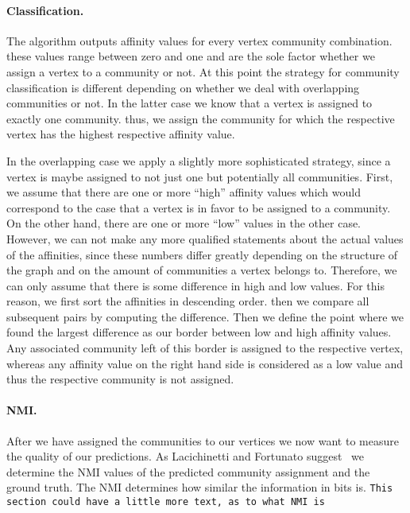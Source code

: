 \paragraph{Classification.}
The algorithm outputs affinity values for every vertex community combination. 
these values range between zero and one and are the sole factor whether we 
assign a vertex to a community or not. At this point the strategy for community classification is 
different depending on whether we deal with overlapping communities or not. In the latter case we 
know that a vertex is assigned to exactly one community. thus, we assign the community for which 
the respective vertex has the highest respective affinity value. 

In the overlapping case we apply a slightly more sophisticated strategy, since a vertex is maybe 
assigned to not just one but potentially all communities. First, we assume that there are one 
or more ``high'' affinity values which would correspond to the 
case that a vertex is in favor to be assigned to a community. On the other hand, there are one or 
more ``low'' values in the other case. However, we can not make any more qualified statements 
about the actual values of the affinities, since these numbers differ greatly depending on the 
structure of the graph and on the amount of communities a vertex belongs to. Therefore, we can 
only assume that there is some difference in high and low values. For this reason, we first 
sort the affinities in descending order. then we compare all subsequent pairs by computing 
the difference. Then we define the point where we found the largest difference as our border 
between low and high affinity values. Any associated community left of this border is 
assigned to the respective vertex, whereas any affinity value on the right hand side is considered 
as a low value and thus the respective community is not assigned.

\paragraph{NMI.}
After we have assigned the communities to our vertices we now want to measure 
the quality of our predictions. As Lacichinetti and Fortunato 
suggest~\cite{LF09} we determine the NMI values of the predicted community 
assignment and the ground truth. The NMI determines how similar the 
information in bits is. \texttt{This section could have a little more text, as to what NMI is}
